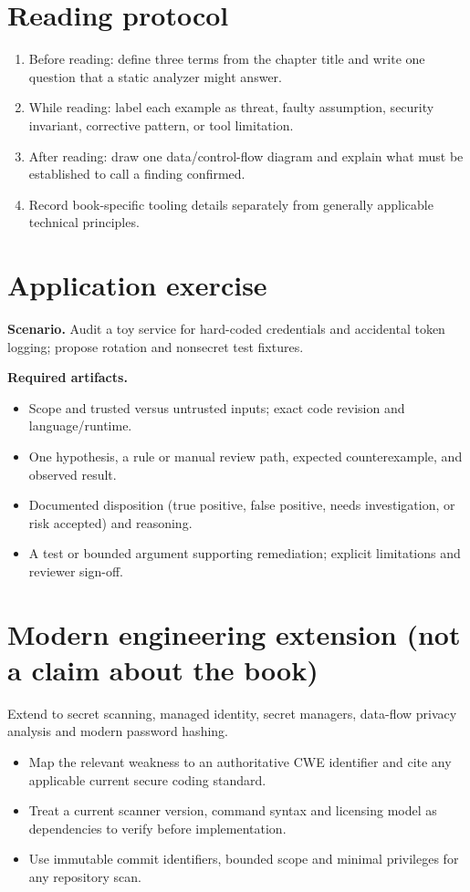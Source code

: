 \documentclass[10pt,letterpaper]{article}
\begin{document}
\section{Reading protocol}
\begin{enumerate}
\item Before reading: define three terms from the chapter title and write one question that a static analyzer might answer.
\item While reading: label each example as threat, faulty assumption, security invariant, corrective pattern, or tool limitation.
\item After reading: draw one data/control-flow diagram and explain what must be established to call a finding confirmed.
\item Record book-specific tooling details separately from generally applicable technical principles.
\end{enumerate}

\section{Application exercise}
\textbf{Scenario.} Audit a toy service for hard-coded credentials and accidental token logging; propose rotation and nonsecret test fixtures.

\textbf{Required artifacts.}\begin{itemize}
\item Scope and trusted versus untrusted inputs; exact code revision and language/runtime.
\item One hypothesis, a rule or manual review path, expected counterexample, and observed result.
\item Documented disposition (true positive, false positive, needs investigation, or risk accepted) and reasoning.
\item A test or bounded argument supporting remediation; explicit limitations and reviewer sign-off.
\end{itemize}

\section{Modern engineering extension (not a claim about the book)}
Extend to secret scanning, managed identity, secret managers, data-flow privacy analysis and modern password hashing.

\begin{itemize}
\item Map the relevant weakness to an authoritative CWE identifier and cite any applicable current secure coding standard.
\item Treat a current scanner version, command syntax and licensing model as dependencies to verify before implementation.
\item Use immutable commit identifiers, bounded scope and minimal privileges for any repository scan.
\end{itemize}
\end{document}
